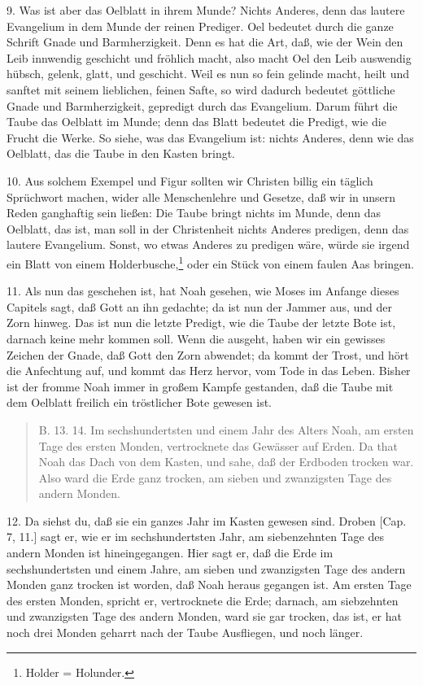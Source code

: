 9. Was ist aber das Oelblatt in ihrem Munde? Nichts Anderes, denn das lautere Evangelium in dem Munde der reinen Prediger. Oel bedeutet durch die ganze Schrift Gnade und Barmherzigkeit. Denn es hat die Art, daß, wie der Wein den Leib innwendig geschicht und fröhlich macht, also macht Oel den Leib auswendig hübsch, gelenk, glatt, und geschicht. Weil es nun so fein gelinde macht, heilt und sanftet mit seinem lieblichen, feinen Safte, so wird dadurch bedeutet göttliche Gnade und Barmherzigkeit, gepredigt durch das Evangelium. Darum führt die Taube das Oelblatt im Munde; denn das Blatt bedeutet die Predigt, wie die Frucht die Werke. So siehe, was das Evangelium ist: nichts Anderes, denn wie das Oelblatt, das die Taube in den Kasten bringt.

10. Aus solchem Exempel und Figur sollten wir Christen billig ein täglich Sprüchwort machen, wider alle Menschenlehre und Gesetze, daß wir in unsern Reden ganghaftig sein ließen: Die Taube bringt nichts im Munde, denn das Oelblatt, das ist, man soll in der Christenheit nichts Anderes predigen, denn das lautere Evangelium. Sonst, wo etwas Anderes zu predigen wäre, würde sie irgend ein Blatt von einem Holderbusche,\footnote{Holder = Holunder.} oder ein Stück von einem faulen Aas bringen.

11. Als nun das geschehen ist, hat Noah gesehen, wie Moses im Anfange dieses Capitels sagt, daß Gott an ihn gedachte; da ist nun der Jammer aus, und der Zorn hinweg. Das ist nun die letzte Predigt, wie die Taube der letzte Bote ist, darnach keine mehr kommen soll. Wenn die ausgeht, haben wir ein gewisses Zeichen der Gnade, daß Gott den Zorn abwendet; da kommt der Trost, und hört die Anfechtung auf, und kommt das Herz hervor, vom Tode in das Leben. Bisher ist der fromme Noah immer in großem Kampfe gestanden, daß die Taube mit dem Oelblatt freilich ein tröstlicher Bote gewesen ist.

\begin{quote}
B. 13. 14. Im sechshundertsten und einem Jahr des Alters Noah, am ersten Tage des ersten Monden, vertrocknete das Gewässer auf Erden. Da that Noah das Dach von dem Kasten, und sahe, daß der Erdboden trocken war. Also ward die Erde ganz trocken, am sieben und zwanzigsten Tage des andern Monden.
\end{quote}

12. Da siehst du, daß sie ein ganzes Jahr im Kasten gewesen sind. Droben [Cap. 7, 11.] sagt er, wie er im sechshundertsten Jahr, am siebenzehnten Tage des andern Monden ist hineingegangen. Hier sagt er, daß die Erde im sechshundertsten und einem Jahre, am sieben und zwanzigsten Tage des andern Monden ganz trocken ist worden, daß Noah heraus gegangen ist. Am ersten Tage des ersten Monden, spricht er, vertrocknete die Erde; darnach, am siebzehnten und zwanzigsten Tage des andern Monden, ward sie gar trocken, das ist, er hat noch drei Monden geharrt nach der Taube Ausfliegen, und noch länger.

